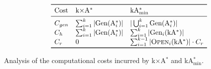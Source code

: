 \documentclass[smallextended]{svjour3}       %
\newcommand{\kastar}{kA$^*$\xspace}
\newcommand{\kastarvar}[1]{\textup{kA}$^*_{#1}$\xspace}
\newcommand{\kastarmin}{\kastarvar{\min}}
\newcommand{\kxastar}{k$\times$A$^*$\xspace}
\newcommand{\astari}[1]{A$^*_{#1}$\xspace}
\newcommand{\newcode}[1]{#1}
\newcommand{\Gen}{\text{Gen}}
\newcommand{\open}{\textsc{Open}\xspace}
\begin{document}
\begin{table}
  \[
  \begin{array}{lll}
    \toprule
    \text{Cost} & \text{\kxastar}                   & \text{\kastarmin} \\
    \midrule
    C_{gen} & \sum_{i=1}^{k} |\Gen(\text{\astari{i}})| & \newcode{|\bigcup_{i=1}^{k} \Gen(\text{\astari{i}})|}\\
    C_{h}   & \newcode{\sum_{i=1}^{k} |\Gen(\text{\astari{i}})|} & \sum_{i=1}^{k} |\Gen_i(\text{\kastar})|\\
    C_r     & \newcode{0}                           & \sum_{i=1}^{k-1} |\open_i(\text{\kastar})| \cdot C_r\\
    \bottomrule
  \end{array}
  \]
  \caption{Analysis of the computational costs incurred by \kxastar and \kastarmin.}
  \label{tab:time-analysis}  
\end{table}




\end{document}
